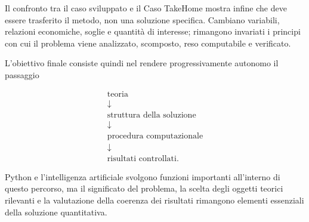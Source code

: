 Il confronto tra il caso sviluppato e il Caso TakeHome mostra infine che deve
essere trasferito il metodo, non una soluzione specifica. Cambiano variabili,
relazioni economiche, soglie e quantit\`{a} di interesse; rimangono invariati i
principi con cui il problema viene analizzato, scomposto, reso computabile e
verificato.

L'obiettivo finale consiste quindi nel rendere progressivamente autonomo il
passaggio

\[
\begin{array}{c}
\text{teoria}
\\[3pt]
\downarrow
\\[3pt]
\text{struttura della soluzione}
\\[3pt]
\downarrow
\\[3pt]
\text{procedura computazionale}
\\[3pt]
\downarrow
\\[3pt]
\text{risultati controllati}.
\end{array}
\]

Python e l'intelligenza artificiale svolgono funzioni importanti all'interno
di questo percorso, ma il significato del problema, la scelta degli oggetti
teorici rilevanti e la valutazione della coerenza dei risultati rimangono
elementi essenziali della soluzione quantitativa.